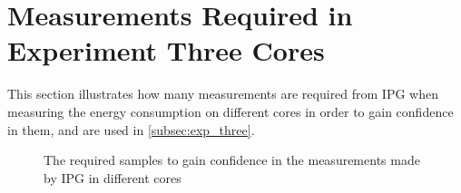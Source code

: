 \section{Measurements Required in Experiment Three Cores}\label{app:exp_three_coch}

This section illustrates how many measurements are required from IPG when measuring the energy consumption on different cores in order to gain confidence in them, and are used in \cref{subsec:exp_three}.

% 
% 

\begin{figure}[H]
    \centering
    \begin{subfigure}[b]{0.4\textwidth}
        \centering
        
    \end{subfigure}
    \hfill
    \begin{subfigure}[b]{0.4\textwidth}
        \centering
        
    \end{subfigure}
    \caption{The required samples to gain confidence in the measurements made by IPG in different cores}
\end{figure}